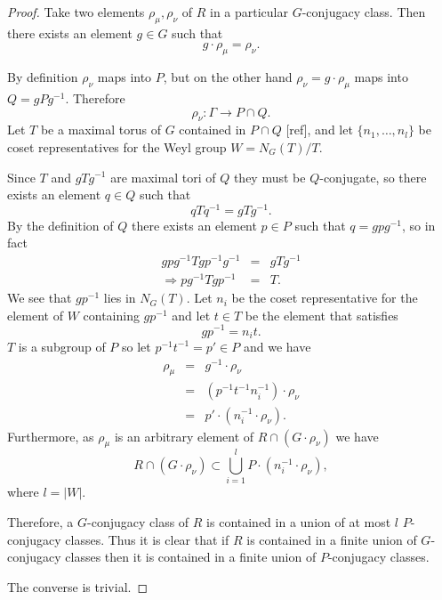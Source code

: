 \begin{proof}
	Take two elements $\rho_\mu, \rho_\nu$ of $R$ in a particular $G$-conjugacy class. Then there exists an element $g\in G$ such that
	\begin{displaymath}
		g\cdot \rho_\mu = \rho_\nu.
	\end{displaymath}
	
	By definition $\rho_\nu$ maps into $P$, but on the other hand $\rho_\nu = g\cdot \rho_\mu$ maps into $Q = gPg^{-1}$. Therefore 
	\begin{displaymath}
		\rho_\nu: \Gamma\rightarrow P \cap Q.
	\end{displaymath}
	Let $T$ be a maximal torus of $G$ contained in $P\cap Q$ [ref], and let $\{n_1, \ldots, n_l\}$ be coset representatives for the Weyl group $W = N_G(T)/T$.
	
	Since $T$ and $gTg^{-1}$ are maximal tori of $Q$ they must be $Q$-conjugate, so there exists an element $q\in Q$ such that
	\begin{displaymath}
		qTq^{-1} = gTg^{-1}.
	\end{displaymath}
	By the definition of $Q$ there exists an element $p\in P$ such that $q = gpg^{-1}$, so in fact
	\begin{eqnarray*}
		gpg^{-1}Tgp^{-1}g^{-1} &=& gTg^{-1} \\
		\Rightarrow pg^{-1}Tgp^{-1} &=& T.
	\end{eqnarray*}
	We see that $gp^{-1}$ lies in $N_G(T)$. Let $n_i$ be the coset representative for the element of $W$ containing $gp^{-1}$ and let $t\in T$ be the element that satisfies
	\begin{displaymath}
		gp^{-1} = n_it.
	\end{displaymath}
	$T$ is a subgroup of $P$ so let $p^{-1}t^{-1} = p' \in P$ and we have
	\begin{eqnarray*}
		\rho_\mu &=& g^{-1}\cdot\rho_\nu\\
		&=& (p^{-1}t^{-1}n_i^{-1})\cdot\rho_\nu\\
		&=& p'\cdot(n_i^{-1}\cdot\rho_\nu). 
	\end{eqnarray*}
	Furthermore, as $\rho_\mu$ is an arbitrary element of $R\cap \left(G\cdot \rho_\nu\right)$ we have
	\begin{displaymath}
		R \cap \left(G\cdot \rho_\nu\right) \subset \bigcup_{i=1}^l P\cdot(n_i^{-1}\cdot\rho_\nu),
	\end{displaymath}
	where $l = |W|$.
	
	Therefore, a $G$-conjugacy class of $R$ is contained in a union of at most $l$ $P$-conjugacy classes. Thus it is clear that if $R$ is contained in a finite union of $G$-conjugacy classes then it is contained in a finite union of $P$-conjugacy classes.
	
	The converse is trivial.
\end{proof}

